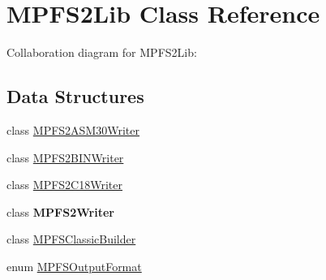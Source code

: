 \hypertarget{class_microchip_m_p_f_s_1_1_m_p_f_s2_lib}{}\section{M\+P\+F\+S2\+Lib Class Reference}
\label{class_microchip_m_p_f_s_1_1_m_p_f_s2_lib}


Collaboration diagram for M\+P\+F\+S2\+Lib\+:
\subsection*{Data Structures}
\begin{DoxyCompactItemize}
\item 
class \hyperlink{class_microchip_m_p_f_s_1_1_m_p_f_s2_lib_1_1_m_p_f_s2_a_s_m30_writer}{M\+P\+F\+S2\+A\+S\+M30\+Writer}
\item 
class \hyperlink{class_microchip_m_p_f_s_1_1_m_p_f_s2_lib_1_1_m_p_f_s2_b_i_n_writer}{M\+P\+F\+S2\+B\+I\+N\+Writer}
\item 
class \hyperlink{class_microchip_m_p_f_s_1_1_m_p_f_s2_lib_1_1_m_p_f_s2_c18_writer}{M\+P\+F\+S2\+C18\+Writer}
\item 
class {\bfseries M\+P\+F\+S2\+Writer}
\item 
class \hyperlink{class_microchip_m_p_f_s_1_1_m_p_f_s2_lib_1_1_m_p_f_s_classic_builder}{M\+P\+F\+S\+Classic\+Builder}
\item 
enum \hyperlink{enum_microchip_m_p_f_s_1_1_m_p_f_s2_lib_1_1_m_p_f_s_output_format}{M\+P\+F\+S\+Output\+Format}
\end{DoxyCompactItemize}
